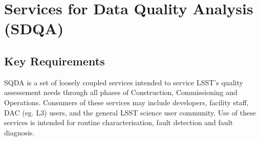 \section{Services for Data Quality Analysis (SDQA)}
\label{sec:sdqa}

\subsection{Key Requirements}

SQDA is a set of loosely coupled services intended to service LSST's quality assessement needs through all phases of Construction, Commissioning and Operations. Consumers of these services may include developers, facility staff, DAC (eg. L3) users, and the general LSST science user community. Use of these services is intended for routine characterisation, fault detection and fault diagnosis. 

